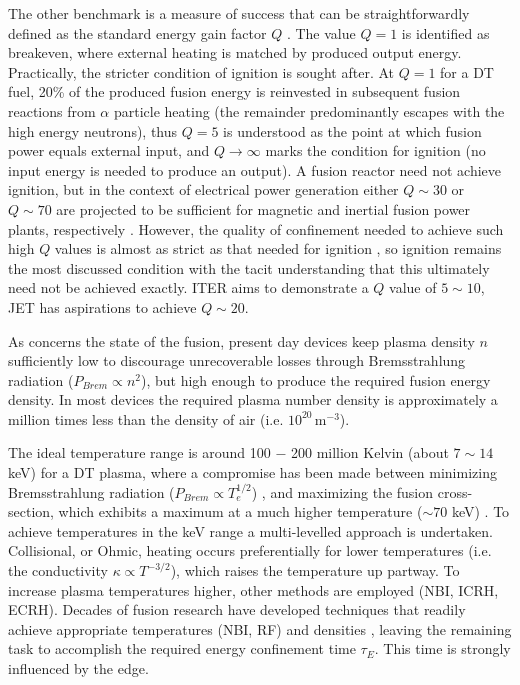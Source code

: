 \documentclass[11pt,titlepage]{report}
\begin{document}
The other benchmark is a measure of success that can be straightforwardly defined as the standard energy gain factor $Q$ \cite{Wesson}. The value $Q = 1$ is identified as breakeven, where external heating is matched by produced output energy. Practically, the stricter condition of ignition is sought after. At $Q = 1$ for a DT fuel, 20\% of the produced fusion energy is reinvested in subsequent fusion reactions from $\alpha$ particle heating (the remainder predominantly escapes with the high energy neutrons), thus $Q = 5$ is understood as the point at which fusion power equals external input, and $Q \rightarrow \infty$ marks the condition for ignition (no input energy is needed to produce an output). A fusion reactor need not achieve ignition, but in the context of electrical power generation either $Q \sim 30$ or $Q \sim 70$ are projected to be sufficient for magnetic and inertial fusion power plants, respectively \cite{LLNL_breakeven_def}. However, the quality of confinement needed to achieve such high $Q$ values is almost as strict as that needed for ignition \cite{EFDA_triple_product}, so ignition remains the most discussed condition with the tacit understanding that this ultimately need not be achieved exactly. ITER aims to demonstrate a $Q$ value of $5 \sim 10$, JET has aspirations to achieve $Q \sim 20$.


As concerns the state of the fusion, present day devices keep plasma density $n$ sufficiently low to discourage unrecoverable losses through Bremsstrahlung radiation ($P_{Brem} \propto n^2$), but high enough to produce the required fusion energy density. In most devices the required plasma number density is approximately a million times less than the density of air (i.e. $10^{20} \, \mathrm{m^{-3}}$).

The ideal temperature range is around 100 $-$ 200 million Kelvin (about $7 \sim 14$ keV) for a DT plasma, where a compromise has been made between minimizing Bremsstrahlung radiation ($P_{Brem} \propto T_e^{1/2}$) \cite{Jackson}, and maximizing the fusion cross-section, which exhibits a maximum at a much higher temperature ($\sim 70$ keV) \cite{Friedberg_527}. To achieve temperatures in the keV range a multi-levelled approach is undertaken. Collisional, or Ohmic, heating occurs preferentially for lower temperatures (i.e. the conductivity $\kappa \propto T^{-3/2}$), which raises the temperature up partway. To increase plasma temperatures higher, other methods are employed (NBI, ICRH, ECRH). Decades of fusion research have developed techniques that readily achieve appropriate temperatures (NBI, RF) and densities \cite{EFDA_triple_product}, leaving the remaining task to accomplish the required energy confinement time $\tau_E$. This time is strongly influenced by the edge.
\end{document}
